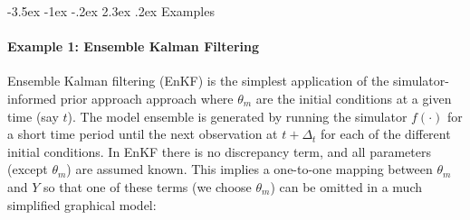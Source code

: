 \documentclass[10pt,a4paper]{article}
\makeatletter
\newcommand{\red}{\textcolor{red}}
\renewcommand\section{\@startsection{section}{1}{\z@}%
                                  {-3.5ex \@plus -1ex \@minus -.2ex}%
                                  {2.3ex \@plus.2ex}%
                                  {\normalfont\large\bfseries}}
\makeatother
\begin{document}
%
%
%
%
%
%								
%
%
%



\newpage

\appendix            
\section{Examples}

\paragraph{Example 1: Ensemble Kalman Filtering}
Ensemble Kalman filtering (EnKF) is the simplest application of the simulator-informed prior approach approach where $\theta_m$ are the initial conditions at a given time (say $t$). The model ensemble is generated by running the simulator $f(\cdot)$ for a short time period until the next observation at $t+\Delta_t$ for each of the different initial conditions. In EnKF there is no discrepancy term, and all parameters (except $\theta_m$) are assumed known. This implies a one-to-one mapping between $\theta_m$ and $Y$ so that one of these terms (we choose $\theta_m$) can be omitted in a much simplified graphical model:
\begin{figure}[h!]
\centering
{}
\end{figure}
\end{document}
